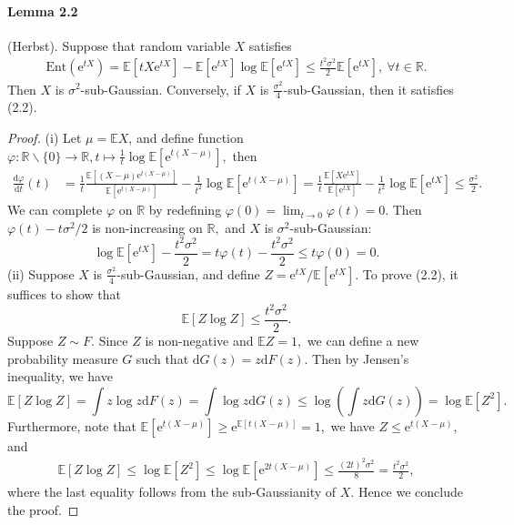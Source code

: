 \documentclass{article}
\newcommand{\E}{\mathbb{E}}
\begin{document}
\paragraph{Lemma 2.2} (Herbst). Suppose that random variable $X$ satisfies
\begin{align*}
	\mathrm{Ent}(\mathrm{e}^{tX}) = \E[tX\mathrm{e}^{tX}] - \E[\mathrm{e}^{tX}]\log\E[\mathrm{e}^{tX}] \leq \frac{t^2\sigma^2}{2}\E[\mathrm{e}^{tX}],\ \forall t\in\mathbb{R}.\tag{2.2}
\end{align*}
Then $X$ is $\sigma^2$-sub-Gaussian. Conversely, if $X$ is $\frac{\sigma^2}{4}$-sub-Gaussian, then it satisfies (2.2).
\begin{proof}
(i) Let $\mu=\E X$, and define function $\varphi:\mathbb{R}\backslash\{0\}\to\mathbb{R},t\mapsto \frac{1}{t}\log\E[\mathrm{e}^{t(X-\mu)}],$ then
\begin{align*}
	\frac{\mathrm{d}\varphi}{\mathrm{d}t}(t) &= \frac{1}{t}\frac{\E[(X-\mu)\mathrm{e}^{t(X-\mu)}]}{\E[\mathrm{e}^{t(X-\mu)}]} - \frac{1}{t^2}\log\E[\mathrm{e}^{t(X-\mu)}]
	= \frac{1}{t}\frac{\E[X\mathrm{e}^{tX}]}{\E[\mathrm{e}^{tX}]} - \frac{1}{t^2}\log\E[\mathrm{e}^{tX}] \leq \frac{\sigma^2}{2}.\tag{2.3}
\end{align*}
We can complete $\varphi$ on $\mathbb{R}$ by redefining $\varphi(0)=\lim_{t\to 0}\varphi(t) = 0$. Then $\varphi(t) - {t\sigma^2}/{2}$ is non-increasing on $\mathbb{R},$ and $X$ is $\sigma^2$-sub-Gaussian:
\begin{equation*}
	\log\E[\mathrm{e}^{tX}] - \frac{t^2\sigma^2}{2} = t\varphi(t) - \frac{t^2\sigma^2}{2} \leq t\varphi(0) = 0.\tag{2.4}
\end{equation*}
(ii) Suppose $X$ is $\frac{\sigma^2}{4}$-sub-Gaussian, and define $Z=\mathrm{e}^{tX} / \E[\mathrm{e}^{tX}].$ To prove (2.2), it suffices to show that 
\begin{equation*}
	\E[Z\log Z]\leq \frac{t^2\sigma^2}{2}.\tag{2.5}
\end{equation*}
Suppose $Z\sim F.$ Since $Z$ is non-negative and $\E Z=1,$ we can define a new probability measure $G$ such that $\mathrm{d}G(z)=z\mathrm{d}F(z)$. Then by Jensen's inequality, we have
\begin{equation*}
	\E[Z\log Z] = \int z\log z\mathrm{d}F(z) = \int \log z\mathrm{d}G(z) \leq \log\left(\int z\mathrm{d}G(z)\right) = \log \E[Z^2].\tag{2.6}
\end{equation*}
Furthermore, note that $\E[\mathrm{e}^{t(X-\mu)}]\geq \mathrm{e}^{\E[t(X-\mu)]}=1,$ we have $Z \leq \mathrm{e}^{t(X-\mu)},$ and
\begin{align*}
	\E[Z\log Z]\leq \log\E[Z^2] \leq \log\E[\mathrm{e}^{2t(X-\mu)}] \leq \frac{(2t)^2\sigma^2}{8} = \frac{t^2\sigma^2}{2},\tag{2.7}
\end{align*}
where the last equality follows from the sub-Gaussianity of $X$. Hence we conclude the proof.
\end{proof}
\end{document}
